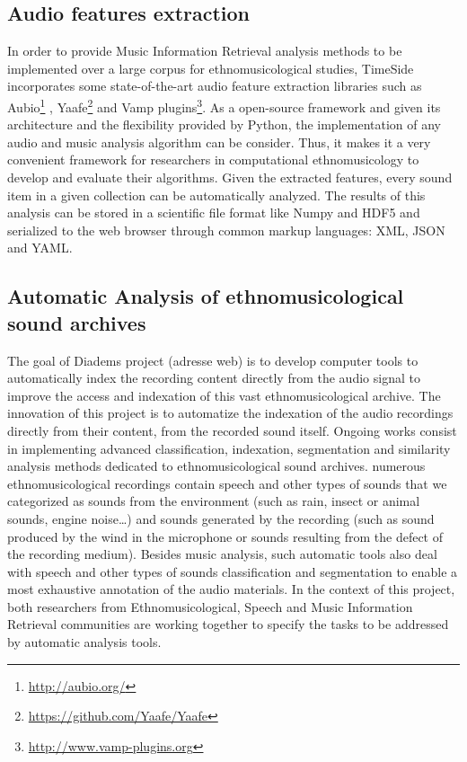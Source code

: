 \documentclass{sig-alternate}
\begin{document}
\subsection{Audio features extraction}
In order to provide Music Information Retrieval analysis methods to be implemented over a large corpus for ethnomusicological studies, TimeSide incorporates some state-of-the-art audio feature extraction libraries such as Aubio\footnote{\url{http://aubio.org/}} \cite{brossierPhD}, Yaafe\footnote{\url{https://github.com/Yaafe/Yaafe}} \cite{yaafe_ISMIR2010} and Vamp plugins\footnote{ \url{http://www.vamp-plugins.org}}.
As a open-source framework and given its architecture and the flexibility provided by Python, the implementation of any audio and music analysis algorithm can be consider. Thus, it makes it a very convenient framework for researchers in computational ethnomusicology to develop and evaluate their algorithms.
Given the extracted features, every sound item in a given collection can be automatically analyzed. The results of this analysis can be stored in a scientific file format like Numpy and HDF5 and serialized to the web browser through common markup languages: XML, JSON and YAML.
\subsection{Automatic Analysis of ethnomusicological sound archives}
The goal of Diadems project (adresse web) is to develop computer tools to automatically index the recording content directly from the audio signal to improve the access and indexation of this vast ethnomusicological archive. The innovation of this project is to automatize the indexation of the audio recordings directly from their content, from the recorded sound itself.
Ongoing works consist in implementing advanced classification, indexation, segmentation and similarity analysis methods dedicated to ethnomusicological sound archives.
numerous ethnomusicological recordings contain speech and other types of sounds that we categorized as sounds from the environment (such as rain, insect or animal sounds, engine noise…) and sounds generated by the recording (such as sound produced by the wind in the microphone or sounds resulting from the defect of the recording medium).
Besides music analysis, such automatic tools also deal with speech and other types of sounds classification and segmentation to enable a most exhaustive annotation of the audio materials.
In the context of this project, both researchers from Ethnomusicological, Speech and Music Information Retrieval communities are working together to specify the tasks to be addressed by automatic analysis tools.
\end{document}
